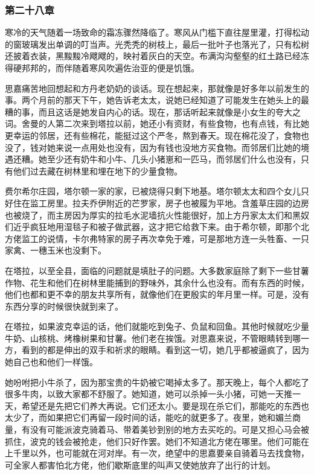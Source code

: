 \subsubsection{第二十八章}

\par 寒冷的天气随着一场致命的霜冻骤然降临了。寒风从门槛下直往屋里灌，打得松动的窗玻璃发出单调的叮当声。光秃秃的树枝上，最后一批叶子也落光了，只有松树还披着衣装，黑黢黢冷飕飕的，映衬着灰白的天空。布满沟沟壑壑的红土路已经冻得硬邦邦的，而伴随着寒风吹遍佐治亚的便是饥饿。
\par 思嘉痛苦地回想起和方丹老奶奶的谈话。现在想起来，那就像是好多年以前发生的事。两个月前的那天下午，她告诉老太太，说她已经知道了可能发生在她头上的最糟的事，而且这话是她发自内心的话。现在，那话听起来就像是小女生的夸大之词。舍曼的人第二次来到塔拉以前，她还小有资财，有些食物，也有点钱，有比她更幸运的邻居，还有些棉花，能挺过这个严冬，熬到春天。现在棉花没了，食物也没了，钱对她来说一点用处也没有，因为有钱也没地方买食物。而邻居们比她的境遇还糟。她至少还有奶牛和小牛、几头小猪崽和一匹马，而邻居们什么也没有，只有他们过去藏在树林里和埋在地下的少量食物。
\par 费尔希尔庄园，塔尔顿一家的家，已被烧得只剩下地基。塔尔顿太太和四个女儿只好住在监工房里。拉夫乔伊附近的芒罗家，房子也被履为平地。含羞草庄园的边房也被烧了，而主房因为厚实的拉毛水泥墙抗火性能很好，加上方丹家太太们和黑奴们近乎疯狂地用湿毯子和被子做武器，这才把它给救下来。由于希尔顿，即那个北方佬监工的说情，卡尔弗特家的房子再次幸免于难，可是那地方连一头牲畜、一只家禽、一穗玉米也没剩下。
\par 在塔拉，以至全县，面临的问题就是填肚子的问题。大多数家庭除了剩下一些甘薯作物、花生和他们在树林里能捕到的野味外，其余什么也没有。而有东西的时候，他们也都和更不幸的朋友共享所有，就像他们在更殷实的年月里一样。可是，没有东西分享的时候很快就到来了。
\par 在塔拉，如果波克幸运的话，他们就能吃到兔子、负鼠和回鱼。其他时候就吃少量牛奶、山核桃、烤橡树果和甘薯。他们老在挨饿。对思嘉来说，不管眼睛转到哪一方，看到的都是伸出的双手和祈求的眼睛。看到这一切，她几乎都被逼疯了，因为她自己也和他们一样饿。
\par 她吩咐把小牛杀了，因为那宝贵的牛奶被它喝掉太多了。那天晚上，每个人都吃了很多牛肉，以致大家都不舒服了。她知道，她可以杀掉一头小猪，可她一天推一天，希望还是先把它们养大再说。它们还太小。要是现在杀它们，那能吃的东西也太少了，而如果把它们再留一段时间的话，能吃的就更多了。夜里，她和媚兰商量，有没有可能派波克骑着马、带着美钞到别的地方去买吃的。可是又担心马会被抓住，波克的钱会被抢走，他们只好作罢。她们不知道北方佬在哪里。他们可能在上千里以外，也可能就在河对岸。有一次，绝望中的思嘉要亲自骑着马去找食物，可全家人都害怕北方佬，他们歇斯底里的叫声又使她放弃了出行的计划。
